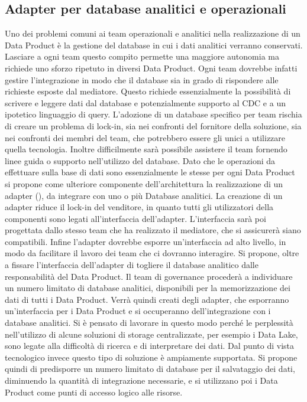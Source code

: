 \documentclass[12pt]{report}
\begin{document}
\subsection{Adapter per database analitici e operazionali}
Uno dei problemi comuni ai team operazionali e analitici nella realizzazione di un Data Product è la gestione del database in cui i dati analitici verranno conservati.
Lasciare a ogni team questo compito permette una maggiore autonomia ma richiede uno sforzo ripetuto in diversi Data Product.
Ogni team dovrebbe infatti gestire l'integrazione in modo che il database sia in grado di rispondere alle richieste esposte dal mediatore.
Questo richiede essenzialmente la possibilità di scrivere e leggere dati dal database e potenzialmente supporto al CDC e a un ipotetico linguaggio di query.
L'adozione di un database specifico per team rischia di creare un problema di lock-in, sia nei confronti del fornitore della soluzione, sia nei confronti dei membri del team, che potrebbero essere gli unici a utilizzare quella tecnologia.
Inoltre difficilmente sarà possibile assistere il team fornendo linee guida o supporto nell'utilizzo del database.
Dato che le operazioni da effettuare sulla base di dati sono essenzialmente le stesse per ogni Data Product si propone come ulteriore componente dell'architettura la realizzazione di un adapter (\cite{designPatterns}), da integrare con uno o più Database analitici.
La creazione di un adapter riduce il lock-in del venditore, in quanto tutti gli utilizzatori della componenti sono legati all'interfaccia dell'adapter.
L'interfaccia sarà poi progettata dallo stesso team che ha realizzato il mediatore, che si assicurerà siano compatibili.
Infine l'adapter dovrebbe esporre un'interfaccia ad alto livello, in modo da facilitare il lavoro dei team che ci dovranno interagire.
Si propone, oltre a fissare l'interfaccia dell'adapter di togliere il database analitico dalle responsabilità del Data Product.
Il team di governance procederà a individuare un numero limitato di database analitici, disponibili per la memorizzazione dei dati di tutti i Data Product.
Verrà quindi creati degli adapter, che esporranno un'interfaccia per i Data Product e si occuperanno dell'integrazione con i database analitici.
Si è pensato di lavorare in questo modo perché le perplessità nell'utilizzo di alcune soluzioni di storage centralizzate, per esempio i Data Lake, sono legate alla difficoltà di ricerca e di interpretare dei dati. 
Dal punto di vista tecnologico invece questo tipo di soluzione è ampiamente supportata.
Si propone quindi di predisporre un numero limitato di database per il salvataggio dei dati, diminuendo la quantità di integrazione necessarie, e si utilizzano poi i Data Product come punti di accesso logico alle risorse.
\end{document}

